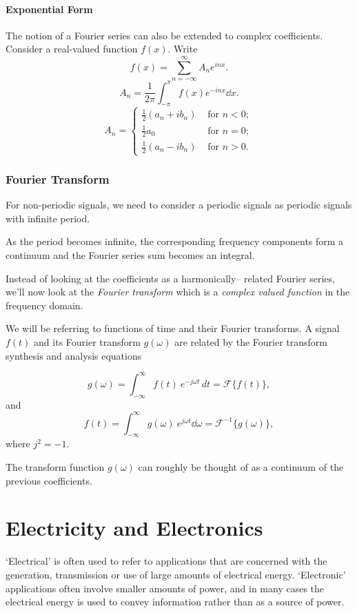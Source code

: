 \documentclass[a4paper,UTF8]{article}
\theoremstyle{mystyle}{
  \newtheorem{law}{Law}
}
\begin{document}
\subsection{Exponential Form}
The notion of a Fourier series can also be extended to complex coefficients. Consider a real-valued function $f(x)$. Write
\[
 f(x)=\sum_{n=-\infty}^{\infty}A_n e^{inx}. 
\]
\[
 A_n=\frac{1}{2\pi}\int_{-\pi}^{\pi}f(x)e^{-inx}\dd{x}. 
\]
\[A_n=\begin{cases}
 \frac{1}{2}(a_n+i b_n) &\text{ for } n<0;\\
 \frac{1}{2} a_0 					&\text{ for } n=0; \\
 \frac{1}{2} (a_n-i b_n) 		&\text{ for } n>0.
\end{cases}
\]

\section{Fourier Transform}
For non-periodic signals, we need to consider a periodic
signals as periodic signals with infinite period.

As the period becomes infinite, the corresponding
frequency components form a continuum and the Fourier
series sum becomes an integral.

Instead of looking at the coefficients as a harmonically–
related Fourier series, we'll now look at the \emph{Fourier
transform} which is a \emph{complex valued function} in the
frequency domain.

We will be referring to functions of time and their Fourier
transforms. A signal $f(t)$ and its Fourier transform $g(\omega)$ are
related by the Fourier transform synthesis and analysis
equations

\[
g(\omega)=\int _{-\infty }^{\infty }f(t)\ e^{-j \omega t }\,dt
=\mathcal{F}\{f(t)\},
\]
and
\[
f(t)=\int _{-\infty }^{\infty }g(\omega) \ e^{j \omega t }\dd{\omega}
=\mathcal{F}^{-1}\{g(\omega)\},
\]
where $j^2=-1$.

The transform function $g(\omega)$ can roughly be thought of as
a continuum of the previous coefficients.

\newpage
\part{Electricity and Electronics}
‘Electrical’ is often used to refer to applications that
are concerned with the generation, transmission or use of large amounts of
electrical energy. ‘Electronic’ applications often involve smaller amounts
of power, and in many cases the electrical energy is used to convey information
rather than as a source of power.
\end{document}
